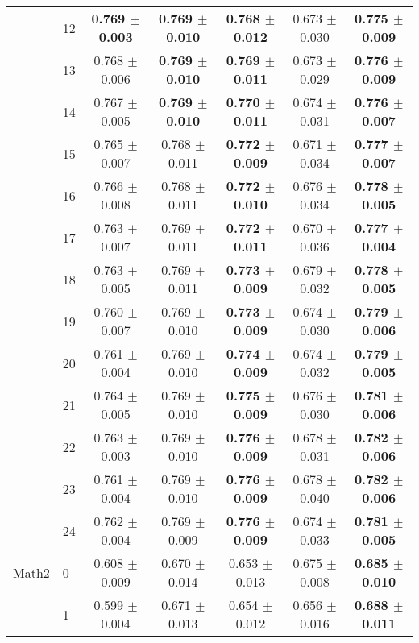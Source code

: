 \begin{table*}[t]
{\begin{tabular}{ll c c c c c}
        & 12 & \textbf{0.769 $\pm$ 0.003} & \textbf{0.769 $\pm$ 0.010} & \textbf{0.768 $\pm$ 0.012} & 0.673 $\pm$ 0.030 & \textbf{0.775 $\pm$ 0.009} \\
        & 13 & 0.768 $\pm$ 0.006 & \textbf{0.769 $\pm$ 0.010} & \textbf{0.769 $\pm$ 0.011} & 0.673 $\pm$ 0.029 & \textbf{0.776 $\pm$ 0.009} \\
        & 14 & 0.767 $\pm$ 0.005 & \textbf{0.769 $\pm$ 0.010} & \textbf{0.770 $\pm$ 0.011} & 0.674 $\pm$ 0.031 & \textbf{0.776 $\pm$ 0.007} \\
        & 15 & 0.765 $\pm$ 0.007 & 0.768 $\pm$ 0.011 & \textbf{0.772 $\pm$ 0.009} & 0.671 $\pm$ 0.034 & \textbf{0.777 $\pm$ 0.007} \\
        & 16 & 0.766 $\pm$ 0.008 & 0.768 $\pm$ 0.011 & \textbf{0.772 $\pm$ 0.010} & 0.676 $\pm$ 0.034 & \textbf{0.778 $\pm$ 0.005} \\
        & 17 & 0.763 $\pm$ 0.007 & 0.769 $\pm$ 0.011 & \textbf{0.772 $\pm$ 0.011} & 0.670 $\pm$ 0.036 & \textbf{0.777 $\pm$ 0.004} \\
        & 18 & 0.763 $\pm$ 0.005 & 0.769 $\pm$ 0.011 & \textbf{0.773 $\pm$ 0.009} & 0.679 $\pm$ 0.032 & \textbf{0.778 $\pm$ 0.005} \\
        & 19 & 0.760 $\pm$ 0.007 & 0.769 $\pm$ 0.010 & \textbf{0.773 $\pm$ 0.009} & 0.674 $\pm$ 0.030 & \textbf{0.779 $\pm$ 0.006} \\
        & 20 & 0.761 $\pm$ 0.004 & 0.769 $\pm$ 0.010 & \textbf{0.774 $\pm$ 0.009} & 0.674 $\pm$ 0.032 & \textbf{0.779 $\pm$ 0.005} \\
        & 21 & 0.764 $\pm$ 0.005 & 0.769 $\pm$ 0.010 & \textbf{0.775 $\pm$ 0.009} & 0.676 $\pm$ 0.030 & \textbf{0.781 $\pm$ 0.006} \\
        & 22 & 0.763 $\pm$ 0.003 & 0.769 $\pm$ 0.010 & \textbf{0.776 $\pm$ 0.009} & 0.678 $\pm$ 0.031 & \textbf{0.782 $\pm$ 0.006} \\
        & 23 & 0.761 $\pm$ 0.004 & 0.769 $\pm$ 0.010 & \textbf{0.776 $\pm$ 0.009} & 0.678 $\pm$ 0.040 & \textbf{0.782 $\pm$ 0.006} \\
        & 24 & 0.762 $\pm$ 0.004 & 0.769 $\pm$ 0.009 & \textbf{0.776 $\pm$ 0.009} & 0.674 $\pm$ 0.033 & \textbf{0.781 $\pm$ 0.005} \\
\midrule
Math2 & 0 & 0.608 $\pm$ 0.009 & 0.670 $\pm$ 0.014 & 0.653 $\pm$ 0.013 & 0.675 $\pm$ 0.008 & \textbf{0.685 $\pm$ 0.010} \\
        & 1 & 0.599 $\pm$ 0.004 & 0.671 $\pm$ 0.013 & 0.654 $\pm$ 0.012 & 0.656 $\pm$ 0.016 & \textbf{0.688 $\pm$ 0.011} \\

\end{tabular}}
\end{table*}
